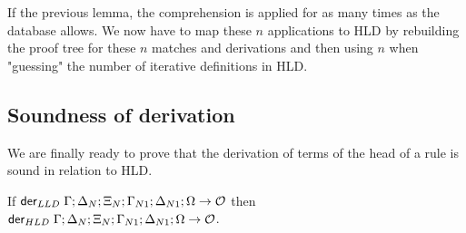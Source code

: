 If the previous lemma, the comprehension is applied for as many times as the
database allows. We now have to map these $n$ applications to HLD by rebuilding
the proof tree for these $n$ matches and derivations and then using
$n$ when "guessing" the number of iterative definitions in HLD.

\subsection{Soundness of derivation}

We are finally ready to prove that the derivation of terms of the head of a rule
is sound in relation to HLD.

\begin{lemma}\label{thm:head_derivation_soundness}
If $\mathsf{der}_{LLD} \; \Gamma; \Delta_N; \Xi_N; \Gamma_{N1}; \Delta_{N1}; \Omega \rightarrow \mathcal{O}$ then
$\mathsf{der}_{HLD} \; \Gamma; \Delta_N; \Xi_N; \Gamma_{N1}; \Delta_{N1}; \Omega \rightarrow \mathcal{O}$.
\end{lemma}

